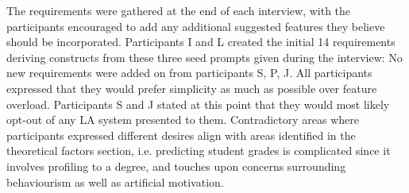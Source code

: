 \documentclass{l4proj}
\begin{document}
The requirements were gathered at the end of each interview, with the participants encouraged to add any additional suggested features they believe should be incorporated. Participants I and L created the initial 14 requirements deriving constructs from these three seed prompts given during the interview:
\newline\newline
{}
\newline\newline
{}
\newline\newline
{}
\newline\newline
No new requirements were added on from participants S, P, J. All participants expressed that they would prefer simplicity as much as possible over feature overload. Participants S and J stated at this point that they would most likely opt-out of any LA system presented to them. Contradictory areas where participants expressed different desires align with areas identified in the theoretical factors section, i.e. predicting student grades is complicated since it involves profiling to a degree, and touches upon concerns surrounding behaviourism as well as artificial motivation. 
\end{document}
